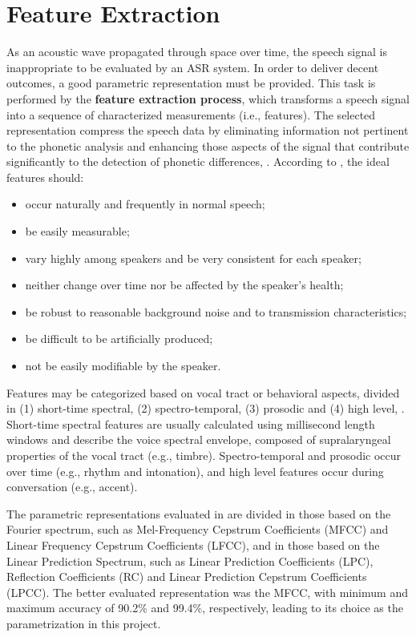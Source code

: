\chapter{Feature Extraction}
\label{ch:feature-extraction}

As an acoustic wave propagated through space over time, the speech signal is inappropriate to be evaluated by an ASR system. In order to deliver decent outcomes, a good parametric representation must be provided. This task is performed by the \textbf{feature extraction process}, which transforms a speech signal into a sequence of characterized measurements (i.e., features). The selected representation compress the speech data by eliminating information not pertinent to the phonetic analysis and enhancing those aspects of the signal that contribute significantly to the detection of phonetic differences, . According to , the ideal features should:

\begin{itemize}\itemsep0pt
    \item occur naturally and frequently in normal speech;
    \item be easily measurable;
    \item vary highly among speakers and be very consistent for each speaker;
    \item neither change over time nor be affected by the speaker's health;
    \item be robust to reasonable background noise and to transmission
    characteristics;
    \item be difficult to be artificially produced;
    \item not be easily modifiable by the speaker.
\end{itemize}

Features may be categorized based on vocal tract or behavioral aspects, divided in (1) short-time spectral, (2) spectro-temporal, (3) prosodic and (4) high level, . Short-time spectral features are usually calculated using millisecond length windows and describe the voice spectral envelope, composed of supralaryngeal properties of the vocal tract (e.g., timbre). Spectro-temporal and prosodic occur over time (e.g., rhythm and intonation), and high level features occur during conversation (e.g., accent).

The parametric representations evaluated in  are divided in those based on the Fourier spectrum, such as Mel-Frequency Cepstrum Coefficients (MFCC) and Linear Frequency Cepstrum Coefficients (LFCC), and in those based on the Linear Prediction Spectrum, such as Linear Prediction Coefficients (LPC), Reflection Coefficients (RC) and Linear Prediction Cepstrum Coefficients (LPCC). The better evaluated representation was the MFCC, with minimum and maximum accuracy of 90.2\% and 99.4\%, respectively, leading to its choice as the parametrization in this project.

